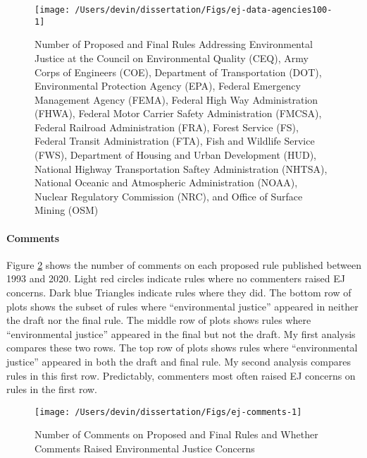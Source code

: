 \documentclass[
      12pt,
        ]{article}
\begin{document}
\begin{figure}

{\centering \texttt{[image: /Users/devin/dissertation/Figs/ej-data-agencies100-1]} 

}

\caption{Number of Proposed and Final Rules Addressing Environmental Justice at the Council on Environmental Quality (CEQ), Army Corps of Engineers (COE), Department of Transportation (DOT), Environmental Protection Agency (EPA), Federal Emergency Management Agency (FEMA), Federal High Way Administration (FHWA), Federal Motor Carrier Safety Administration (FMCSA), Federal Railroad Administration (FRA), Forest Service (FS), Federal Transit Administration (FTA), Fish and Wildlife Service (FWS), Department of Housing and Urban Development (HUD), National Highway Transportation Saftey Administration (NHTSA), National Oceanic and Atmospheric Administration (NOAA), Nuclear Regulatory Commission (NRC), and Office of Surface Mining (OSM)}\label{fig:ej-data-agencies100}
\end{figure}

\hypertarget{comments}{%
\paragraph{Comments}\label{comments}}

Figure \ref{fig:ej-comments} shows the number of comments on each proposed rule published between 1993 and 2020. Light red circles indicate rules where no commenters raised EJ concerns. Dark blue Triangles indicate rules where they did. The bottom row of plots shows the subset of rules where ``environmental justice'' appeared in neither the draft nor the final rule. The middle row of plots shows rules where ``environmental justice'' appeared in the final but not the draft. My first analysis compares these two rows. The top row of plots shows rules where ``environmental justice'' appeared in both the draft and final rule. My second analysis compares rules in this first row. Predictably, commenters most often raised EJ concerns on rules in the first row.

\begin{figure}

{\centering \texttt{[image: /Users/devin/dissertation/Figs/ej-comments-1]} 

}

\caption{Number of Comments on Proposed and Final Rules and Whether Comments Raised Environmental Justice Concerns}\label{fig:ej-comments}
\end{figure}
\end{document}
